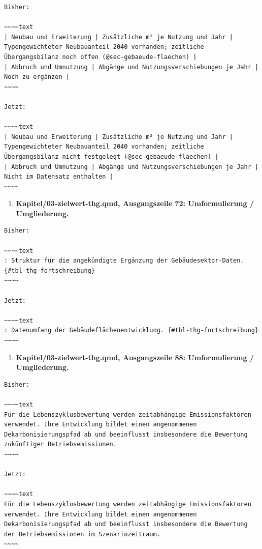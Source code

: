 \documentclass[
  ngerman,
  a4paper,
  DIV=11]{scrreprt}
\providecommand{\tightlist}{%
  \setlength{\itemsep}{0pt}\setlength{\parskip}{0pt}}
\begin{document}
\begin{verbatim}
Bisher:

~~~~text
| Neubau und Erweiterung | Zusätzliche m² je Nutzung und Jahr | Typengewichteter Neubauanteil 2040 vorhanden; zeitliche Übergangsbilanz noch offen (@sec-gebaeude-flaechen) |
| Abbruch und Umnutzung | Abgänge und Nutzungsverschiebungen je Jahr | Noch zu ergänzen |
~~~~

Jetzt:

~~~~text
| Neubau und Erweiterung | Zusätzliche m² je Nutzung und Jahr | Typengewichteter Neubauanteil 2040 vorhanden; zeitliche Übergangsbilanz nicht festgelegt (@sec-gebaeude-flaechen) |
| Abbruch und Umnutzung | Abgänge und Nutzungsverschiebungen je Jahr | Nicht im Datensatz enthalten |
~~~~
\end{verbatim}

\begin{enumerate}
\def\labelenumi{\arabic{enumi}.}
\setcounter{enumi}{103}
\tightlist
\item
  \textbf{Kapitel/03-zielwert-thg.qmd, Ausgangszeile 72: Umformulierung
  / Umgliederung.}
\end{enumerate}

\begin{verbatim}
Bisher:

~~~~text
: Struktur für die angekündigte Ergänzung der Gebäudesektor-Daten. {#tbl-thg-fortschreibung}
~~~~

Jetzt:

~~~~text
: Datenumfang der Gebäudeflächenentwicklung. {#tbl-thg-fortschreibung}
~~~~
\end{verbatim}

\begin{enumerate}
\def\labelenumi{\arabic{enumi}.}
\setcounter{enumi}{104}
\tightlist
\item
  \textbf{Kapitel/03-zielwert-thg.qmd, Ausgangszeile 88: Umformulierung
  / Umgliederung.}
\end{enumerate}

\begin{verbatim}
Bisher:

~~~~text
Für die Lebenszyklusbewertung werden zeitabhängige Emissionsfaktoren verwendet. Ihre Entwicklung bildet einen angenommenen Dekarbonisierungspfad ab und beeinflusst insbesondere die Bewertung zukünftiger Betriebsemissionen.
~~~~

Jetzt:

~~~~text
Für die Lebenszyklusbewertung werden zeitabhängige Emissionsfaktoren verwendet. Ihre Entwicklung bildet einen angenommenen Dekarbonisierungspfad ab und beeinflusst insbesondere die Bewertung der Betriebsemissionen im Szenariozeitraum.
~~~~
\end{verbatim}
\end{document}
